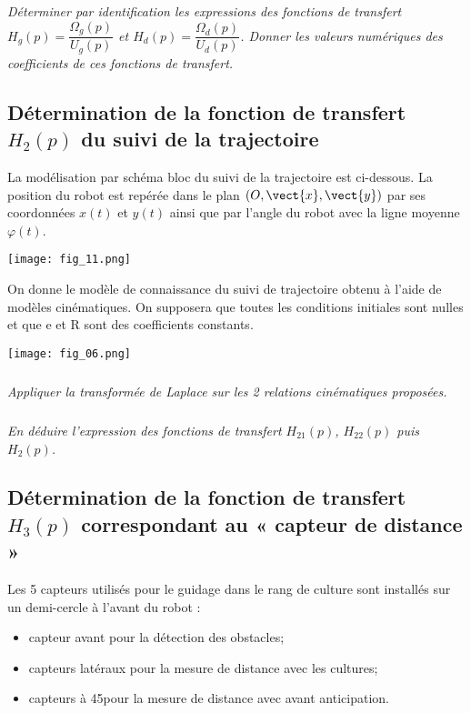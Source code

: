 \begin{multicols}{2}
\subparagraph{}
\textit{Déterminer par identification les expressions des fonctions de transfert $H_g(p) = \dfrac{\Omega_g(p)}{U_g(p)}$ et
$H_d(p) = \dfrac{\Omega_d(p)}{U_d(p)}$.  Donner les valeurs numériques des coefficients de ces fonctions de transfert. }
\ifprof
\begin{corrige}
\end{corrige}
\else
\fi


\subsection*{Détermination de la fonction de transfert $H_2 (p)$ du suivi de la trajectoire}

La modélisation par schéma bloc du suivi de la trajectoire est ci-dessous. La position du robot est repérée dans le plan $\left(O,\vect{x},\vect{y}\right)$ par ses coordonnées $x(t)$ et $y(t)$ ainsi que par l’angle du robot avec la ligne moyenne $\varphi(t)$. 

\begin{center}
\texttt{[image: fig\_11.png]}
\end{center}


On donne le modèle de connaissance du suivi de trajectoire obtenu à l’aide de modèles cinématiques. On supposera que toutes les conditions initiales sont nulles et que e et R sont des coefficients constants. 

\begin{center}
\texttt{[image: fig\_06.png]}
\end{center}


\subparagraph{}
\textit{Appliquer la transformée de Laplace sur les 2 relations cinématiques proposées. }
\ifprof
\begin{corrige}
\end{corrige}
\else
\fi


\subparagraph{}
\textit{ En déduire l’expression des  fonctions de transfert $H_{21} (p)$, $H_{22} (p)$ puis $H_2 (p)$.  }
\ifprof
\begin{corrige}
\end{corrige}
\else
\fi

 \subsection*{Détermination de la fonction de transfert $H_3 (p)$ correspondant au « capteur de distance » }

Les 5 capteurs utilisés pour le guidage dans le  rang de culture sont installés sur un demi-cercle à l’avant du robot : 
\begin{itemize}
\item capteur avant pour la détection des obstacles;
\item capteurs latéraux pour la mesure de distance avec les cultures;
\item capteurs à 45\degres pour la mesure de distance avec avant  anticipation. 
\end{itemize}


\end{multicols}
